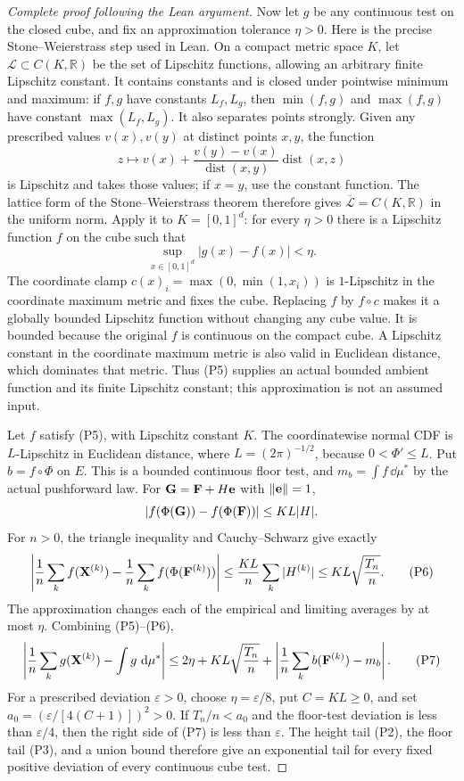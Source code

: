 \begin{proof}[Complete proof following the Lean argument]
Now let $g$ be any continuous test on the closed cube, and fix an
approximation tolerance $\eta>0$.
Here is the precise Stone--Weierstrass step used in Lean. On a compact
metric space $K$, let $\mathcal L\subset C(K,\mathbb R)$ be the set of
Lipschitz functions, allowing an arbitrary finite Lipschitz constant.
It contains constants and is closed under pointwise minimum and maximum:
if $f,g$ have constants $L_f,L_g$, then $\min(f,g)$ and $\max(f,g)$ have
constant $\max(L_f,L_g)$.
It also separates points strongly. Given any prescribed values $v(x),v(y)$
at distinct points $x,y$, the function
\[
 z\longmapsto v(x)+\frac{v(y)-v(x)}{\operatorname{dist}(x,y)}
                                  \operatorname{dist}(x,z)
                                                        \tag{P4}
\]
is Lipschitz and takes those values; if $x=y$, use the constant function.
The lattice form of the Stone--Weierstrass theorem therefore gives
$\overline{\mathcal L}=C(K,\mathbb R)$ in the uniform norm.
Apply it to $K=[0,1]^d$: for every $\eta>0$ there is a Lipschitz function
$f$ on the cube such that
\[
                 \sup_{x\in[0,1]^d}|g(x)-f(x)|<\eta.       \tag{P5}
\]
The coordinate clamp $c(x)_i=\max(0,\min(1,x_i))$ is $1$-Lipschitz
in the coordinate maximum metric and fixes the cube. Replacing $f$ by
$f\circ c$ makes it a globally bounded Lipschitz function without
changing any cube value. It is bounded because the original $f$ is
continuous on the compact cube. A Lipschitz constant in the coordinate
maximum metric is also valid in Euclidean distance, which dominates that
metric. Thus (P5) supplies an actual bounded ambient function and its
finite Lipschitz constant; this approximation is not an assumed input.

Let $f$ satisfy (P5), with Lipschitz constant $K$.
The coordinatewise normal CDF is $L$-Lipschitz in Euclidean distance,
where $L=(2\pi)^{-1/2}$, because $0<\Phi'\le L$.
Put $b=f\circ\Phi$ on $E$. This is a bounded continuous floor test,
and $m_b=\int f\,\dd\mu^\ast$ by the actual pushforward law.
For $\mathbf G=\mathbf F+H\mathbf e$ with $\|\mathbf e\|=1$,
\[
 |f(\Phi(\mathbf G))-f(\Phi(\mathbf F))|\le KL|H|.
\]
For $n>0$, the triangle inequality and Cauchy--Schwarz give exactly
\[
 \left|\frac1n\sum_k f(\mathbf X^{(k)})
       -\frac1n\sum_k f(\Phi(\mathbf F^{(k)}))\right|
 \le\frac{KL}{n}\sum_k|H^{(k)}|
 \le KL\sqrt{\frac{T_n}{n}}.                 \tag{P6}
\]
The approximation changes each of the empirical and limiting averages
by at most $\eta$. Combining (P5)--(P6),
\[
 \left|\frac1n\sum_k g(\mathbf X^{(k)})-\int g\,\,\mathrm d\mu^\ast\right|
 \le2\eta+KL\sqrt{\frac{T_n}{n}}
       +\left|\frac1n\sum_k b(\mathbf F^{(k)})-m_b\right|. \tag{P7}
\]
For a prescribed deviation $\varepsilon>0$, choose
$\eta=\varepsilon/8$, put $C=KL\ge0$, and set
$a_0=(\varepsilon/[4(C+1)])^2>0$.
If $T_n/n<a_0$ and the floor-test deviation is less than
$\varepsilon/4$, then the right side of (P7) is less than
$\varepsilon$. The height tail (P2), the floor tail (P3), and a union
bound therefore give an exponential tail for every fixed positive
deviation of every continuous cube test.


\end{proof}

